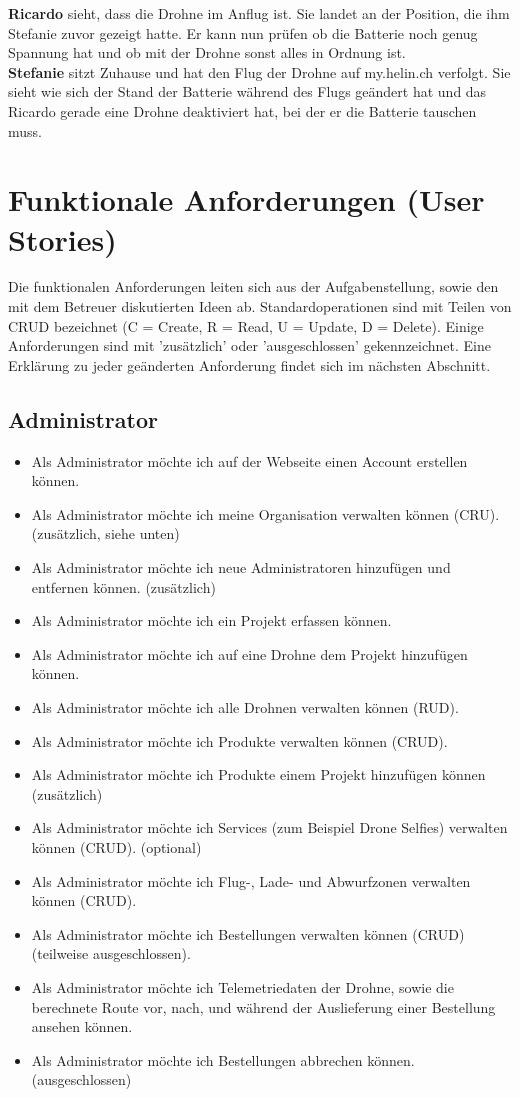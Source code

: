 \textbf{Ricardo} sieht, dass die Drohne im Anflug ist. Sie landet an der Position, die ihm Stefanie zuvor gezeigt hatte. Er kann nun prüfen ob die Batterie noch genug Spannung hat und ob mit der Drohne sonst alles in Ordnung ist.\\

\textbf{Stefanie} sitzt Zuhause und hat den Flug der Drohne auf my.helin.ch verfolgt. Sie sieht wie sich der Stand der Batterie während des Flugs geändert hat und das Ricardo gerade eine Drohne deaktiviert hat, bei der er die Batterie tauschen muss.

\newpage
\section{Funktionale Anforderungen (User Stories)}

Die funktionalen Anforderungen leiten sich aus der Aufgabenstellung, sowie den mit dem Betreuer diskutierten Ideen ab. Standardoperationen sind mit Teilen von CRUD bezeichnet (C = Create, R = Read, U = Update, D = Delete). Einige Anforderungen sind mit 'zusätzlich' oder 'ausgeschlossen' gekennzeichnet. Eine Erklärung zu jeder geänderten Anforderung findet sich im nächsten Abschnitt.

\subsection{Administrator}
\begin{itemize}
\item Als Administrator möchte ich auf der Webseite einen Account erstellen können.
\item Als Administrator möchte ich meine Organisation verwalten können (CRU). (zusätzlich, siehe unten)
\item Als Administrator möchte ich neue Administratoren hinzufügen und entfernen können. (zusätzlich)
\item Als Administrator möchte ich ein Projekt erfassen können.
\item Als Administrator möchte ich auf eine Drohne dem Projekt hinzufügen können.
\item Als Administrator möchte ich alle Drohnen verwalten können (RUD).
\item Als Administrator möchte ich Produkte verwalten können (CRUD).
\item Als Administrator möchte ich Produkte einem Projekt hinzufügen können (zusätzlich)
\item Als Administrator möchte ich Services (zum Beispiel Drone Selfies) verwalten können (CRUD). (optional)
\item Als Administrator möchte ich Flug-, Lade- und Abwurfzonen verwalten können (CRUD).
\item Als Administrator möchte ich Bestellungen verwalten können (CRUD) (teilweise ausgeschlossen).
\item Als Administrator möchte ich Telemetriedaten der Drohne, sowie die berechnete Route vor, nach, und während der Auslieferung einer Bestellung ansehen können.
\item Als Administrator möchte ich Bestellungen abbrechen können. (ausgeschlossen)
\end{itemize}

